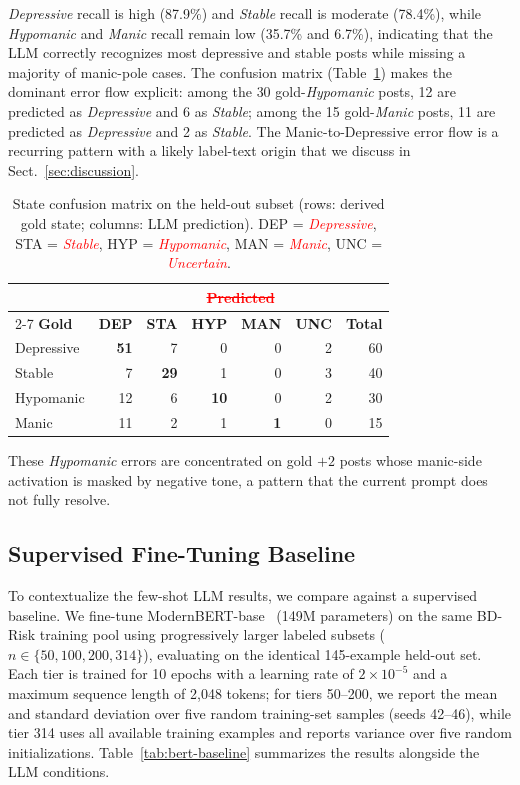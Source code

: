 \documentclass[runningheads]{llncs}
\newcommand{\rev}[1]{\textcolor{red}{#1}}
\newcommand{\del}[1]{\textcolor{red}{\sout{#1}}}
\newcommand{\cmpredheader}{& \multicolumn{6}{c}{\del{\textbf{Predicted}}} \\ \cmidrule(lr){2-7}}
\newcommand{\rev}[1]{#1}
\newcommand{\del}[1]{}
\newcommand{\cmpredheader}{}
\begin{document}
\emph{Depressive} recall is high (87.9\%) and \emph{Stable} recall is moderate (78.4\%), while \emph{Hypomanic} and \emph{Manic} recall remain low (35.7\% and 6.7\%), indicating that the LLM correctly recognizes most depressive and stable posts while missing a majority of manic-pole cases. The confusion matrix (Table~\ref{tab:state-cm}) makes the dominant error flow explicit: among the 30 gold-\emph{Hypomanic} posts, 12 are predicted as \emph{Depressive} and 6 as \emph{Stable}; among the 15 gold-\emph{Manic} posts, 11 are predicted as \emph{Depressive} and 2 as \emph{Stable}. The Manic-to-Depressive error flow is a recurring pattern with a likely label-text origin that we discuss in Sect.~\ref{sec:discussion}.

\begin{table}[t]
\caption{State confusion matrix on the held-out subset (rows: derived gold state; columns: LLM prediction). DEP = \rev{\emph{Depressive}}, STA = \rev{\emph{Stable}}, HYP = \rev{\emph{Hypomanic}}, MAN = \rev{\emph{Manic}}, UNC = \rev{\emph{Uncertain}}.}
\label{tab:state-cm}
\centering
\setlength{\tabcolsep}{8pt}
\begin{tabular}{lrrrrrr}
\toprule
\cmpredheader
\textbf{Gold} & \textbf{DEP} & \textbf{STA} & \textbf{HYP} & \textbf{MAN} & \textbf{UNC} & \textbf{Total} \\
\midrule
Depressive & \textbf{51} & 7 & 0 & 0 & 2 & 60 \\
Stable & 7 & \textbf{29} & 1 & 0 & 3 & 40 \\
Hypomanic & 12 & 6 & \textbf{10} & 0 & 2 & 30 \\
Manic & 11 & 2 & 1 & \textbf{1} & 0 & 15 \\
\bottomrule
\end{tabular}
\end{table}

These \emph{Hypomanic} errors are concentrated on gold $+2$ posts whose manic-side activation is masked by negative tone, a pattern that the current prompt does not fully resolve.

\subsection{Supervised Fine-Tuning Baseline}
\label{sec:bert}

To contextualize the few-shot LLM results, we compare against a supervised baseline. We fine-tune ModernBERT-base~\cite{warner2025modernbert} (149M parameters) on the same BD-Risk training pool using progressively larger labeled subsets ($n \in \{50, 100, 200, 314\}$), evaluating on the identical 145-example held-out set. Each tier is trained for 10 epochs with a learning rate of $2 \times 10^{-5}$ and a maximum sequence length of 2,048 tokens; for tiers 50--200, we report the mean and standard deviation over five random training-set samples (seeds 42--46), while tier 314 uses all available training examples and reports variance over five random initializations. Table~\ref{tab:bert-baseline} summarizes the results alongside the LLM conditions.
\end{document}
